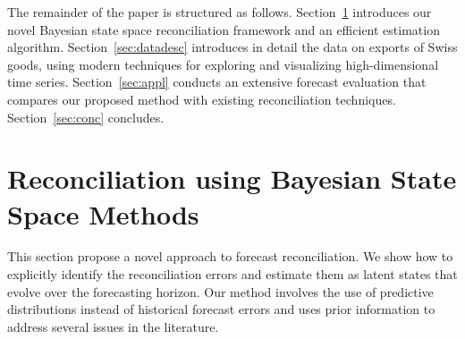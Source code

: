 \documentclass[a4paper,fleqn,11pt]{article}
\begin{document}
The remainder of the paper is structured as follows. Section~\ref{sec:model} introduces our novel Bayesian state space reconciliation framework and an efficient estimation algorithm.  Section~\ref{sec:datadesc} introduces in detail the data on exports of Swiss goods, using modern techniques for exploring and visualizing high-dimensional time series.  Section~\ref{sec:appl} conducts an extensive forecast evaluation that compares our proposed method with existing reconciliation techniques. Section~\ref{sec:conc} concludes.






\section{Reconciliation using Bayesian State Space Methods}\label{sec:model}

This section propose a novel approach to forecast reconciliation. We show how to explicitly identify the reconciliation errors and estimate them as latent states that evolve over the forecasting horizon. Our method involves the use of predictive distributions instead of historical forecast errors and uses prior information to address several issues in the literature. 
\end{document}
